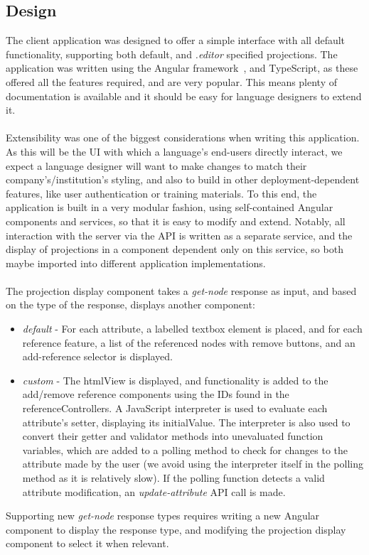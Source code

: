 \documentclass{article}
\begin{document}
{%

\subsection{Design}
The client application was designed to offer a simple interface with all default functionality, supporting both default, and \emph{.editor} specified projections. The application was written using the Angular framework~\cite{angular}, and TypeScript, as these offered all the features required, and are very popular. This means plenty of documentation is available and it should be easy for language designers to extend it.
\\
\\
Extensibility was one of the biggest considerations when writing this application. As this will be the UI with which a language's end-users directly interact, we expect a language designer will want to make changes to match their company's/institution's styling, and also to build in other deployment-dependent features, like user authentication or training materials. To this end, the application is built in a very modular fashion, using self-contained Angular components and services, so that it is easy to modify and extend. Notably, all interaction with the server via the API is written as a separate service, and the display of projections in a component dependent only on this service, so both maybe imported into different application implementations. 
\\
\\
The projection display component takes a \emph{get-node} response as input, and based on the type of the response, displays another component:
\begin{itemize}
\item \emph{default} - For each attribute, a labelled textbox element is placed, and for each reference feature, a list of the referenced nodes with remove buttons, and an add-reference selector is displayed.
\item \emph{custom} - The htmlView is displayed, and functionality is added to the add/remove reference components using the IDs found in the referenceControllers. A JavaScript interpreter is used to evaluate each attribute's setter, displaying its initialValue. The interpreter is also used to convert their getter and validator methods into unevaluated function variables, which are added to a polling method to check for changes to the attribute made by the user (we avoid using the interpreter itself in the polling method as it is relatively slow). If the polling function detects a valid attribute modification, an \emph{update-attribute} API call is made.
\end{itemize}
Supporting new \emph{get-node} response types requires writing a new Angular component to display the response type, and modifying the projection display component to select it when relevant.
}
\end{document}
